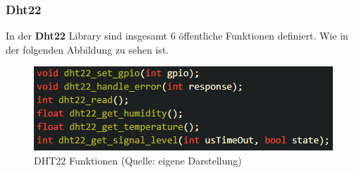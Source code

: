 \subsubsection{Dht22}\label{sec:esp-idf-libraries-dht22}


In der \textbf{Dht22} Library sind insgesamt 6 öffentliche Funktionen definiert. Wie in der folgenden Abbildung zu sehen ist.

\begin{figure}[H]
    \begin{center}
        \includegraphics[scale=1]{images/dht22_functions.png}
        \caption{DHT22 Funktionen (Quelle: eigene Darstellung)}
        \label{abb:dht22_funcionts}
    \end{center}    
\end{figure}

